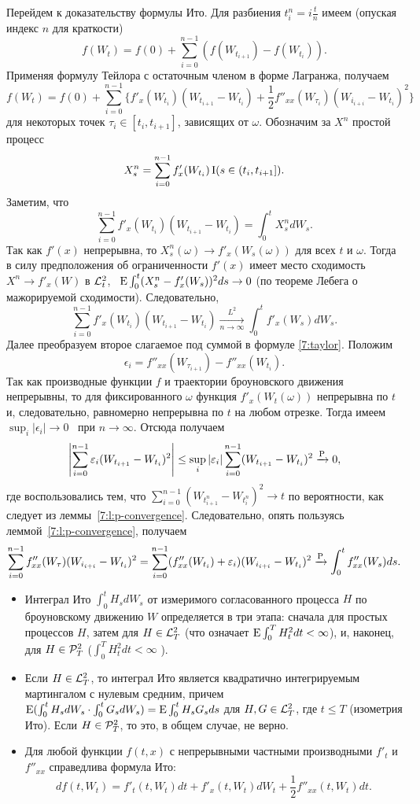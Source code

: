 Перейдем к доказательству формулы Ито.
Для разбиения $t_i^n = i\frac tn$ имеем (опуская индекс $n$ для краткости)
\[
f(W_t) = f(0) + \sum_{i=0}^{n-1} (f(W_{t_{i+1}}) - f(W_{t_i})).
\]
Применяя формулу Тейлора с остаточным членом в форме Лагранжа, получаем
\begin{equation}
\label{7:taylor}
f(W_t) = f(0) + \sum_{i=0}^{n-1} \biggl\{f'_x(W_{t_i})(W_{t_{i+1}} - W_{t_i})
+ \frac12 f''_{xx}(W_{\tau_i})(W_{i_{i+i}}-W_{t_i})^2 \biggr\} 
\end{equation}
для некоторых точек $\tau_i \in[t_i,t_{i+1}]$, зависящих от $\omega$.
Обозначим за $X^n$ простой процесс
\[
X^n_s = \sum_{i=0}^{n-1} f'_x(W_{t_i}) \I(s\in(t_i,t_{i+1}]).
\]
Заметим, что 
\[
\sum_{i=0}^{n-1} f'_x(W_{t_i})(W_{t_{i+1}} - W_{t_i}) = \int_0^t X_s^n d W_s.
\]
Так как $f'(x)$ непрерывна, то $X^n_s(\omega) \to f'_x(W_s(\omega))$ для всех $t$ и $\omega$. Тогда в силу предположения об ограниченности $f'(x)$ имеет место сходимость $X^n\to f'_x(W)$ в $\L^2_t$, \te\ $\E \int_0^t (X_s^n - f'_x(W_s))^2 ds \to 0$ (по теореме Лебега о мажорируемой сходимости).
Следовательно,
\[
\sum_{i=0}^{n-1} f'_x(W_{t_i})(W_{t_{i+1}} - W_{t_i}) \xrightarrow[n\to\infty]{L^2} \int_0^t f'_x(W_s) d W_s.
\]
Далее преобразуем второе слагаемое под суммой в формуле \eqref{7:taylor}.
Положим
\[
\epsilon_i = f''_{xx}(W_{\tau_{i+1}}) - f''_{xx}(W_{t_i}).
\]
Так как производные функции $f$ и траектории броуновского движения непрерывны, то для фиксированного $\omega$ функция $f'_x(W_t(\omega))$ непрерывна по $t$ и, следовательно, равномерно непрерывна по $t$ на любом отрезке.
Тогда имеем $\sup_i |\epsilon_i|\to 0$ \as\ при $n\to\infty$.
Отсюда получаем
\[
\Biggl|\sum_{i=0}^{n-1} \epsilon_i (W_{t_{i+1}} - W_{t_i})^2\Biggr|
\le \sup_i |\epsilon_i| \sum_{i=0}^{n-1} (W_{t_{i+1}} - W_{t_i})^2
\xrightarrow{\P} 0,
\]
где воспользовались тем, что $\sum_{i=0}^{n-1} (W_{t_{i+1}^n}-W_{t_i^n})^2 \to t$ по вероятности, как следует из леммы~\ref{7:l:p-convergence}.
Следовательно, опять пользуясь леммой~\ref{7:l:p-convergence}, получаем
\[
\sum_{i=0}^{n-1} f''_{xx}(W_{\tau})(W_{i_{i+i}}-W_{t_i})^2
= \sum_{i=0}^{n-1} (f''_{xx}(W_{t_i}) + \epsilon_i)(W_{i_{i+i}}-W_{t_i})^2
\xrightarrow{\P} \int_0^t f''_{xx}(W_s) ds.
\]


\summary
\begin{itemize}
\item Интеграл Ито $\int_0^t H_s d W_s$ от измеримого согласованного процесса $H$ по броуновскому движению $W$ определяется в три этапа: сначала для простых процессов $H$, затем для $H\in\L^2_T$ (что означает $\E \int_0^T H_t^2 dt < \infty$), и, наконец, для $H\in\PP^2_T$ ($\int_0^T H_t^2 dt < \infty$ \as).

\item Если $H\in \L^2_T$, то интеграл Ито является квадратично интегрируемым мартингалом с нулевым средним, причем  $\E(\int_0^t H_s dW_s \cdot \int_0^t G_s d W_s) = \E\int_0^t H_sG_s ds$ для $H,G\in\L^2_T$, где $t\le T$ (изометрия Ито).
Если $H\in\PP^2_T$, то это, в общем случае, не верно.

\item Для любой функции $f(t,x)$ с непрерывными частными производными $f'_t$ и $f''_{xx}$ справедлива формула Ито:
\[
d f(t,W_t) = f'_t(t,W_t) dt + f'_x(t,W_t) dW_t + \frac12 f''_{xx}(t,W_t) dt.
\]
\end{itemize}
